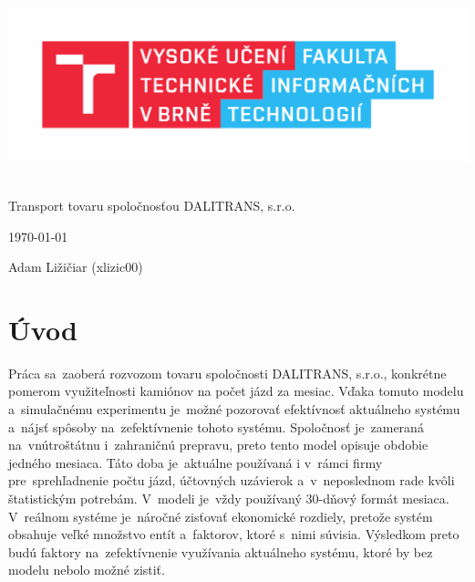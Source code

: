\documentclass[a4paper, 11pt]{article}
\begin{document}
	\begin{titlepage}
		\begin{center}
			\includegraphics[width=0.77\linewidth]{resources/logo_FIT.pdf} \\


			 \\
			\LARGE{Transport tovaru spoločnosťou DALITRANS, s.r.o.} \\
		\end{center}

		\begin{minipage}[b]{0.4 \textwidth}
			\raggedright
			{\Large \today}
		\end{minipage}
		\hfill
		\begin{minipage}[b]{0.6 \textwidth}
			\raggedleft
			\Large
			Adam Ližičiar (xlizic00)\\
		\end{minipage}		
	\end{titlepage}

	\setcounter{page}{1}
	\tableofcontents
	\clearpage

	\setcounter{page}{1}
	
	\section{Úvod}
	Práca sa~zaoberá rozvozom tovaru spoločnosti DALITRANS, s.r.o.,
    konkrétne pomerom využiteľnosti kamiónov na počet jázd za mesiac.
    Vďaka tomuto modelu a~simulačnému experimentu je~možné pozorovať
    efektívnosť aktuálneho systému a~nájsť spôsoby na~zefektívnenie
    tohoto systému. Spoločnosť je~zameraná na~vnútroštátnu i~zahraničnú prepravu,
    preto tento model opisuje obdobie jedného mesiaca. Táto doba
    je~aktuálne používaná i v~rámci firmy pre~sprehľadnenie počtu jázd,
    účtovných uzávierok a~v~neposlednom rade kvôli štatistickým
    potrebám. V~modeli je~vždy používaný 30-dňový formát mesiaca.\newline
    V~reálnom systéme je~náročné zisťovať ekonomické rozdiely, pretože
    systém obsahuje veľké množstvo entít a~faktorov, ktoré s~nimi súvisia.
    Výsledkom preto budú faktory na~zefektívnenie využívania aktuálneho systému,
    ktoré by bez modelu nebolo možné zistiť.
\end{document}
